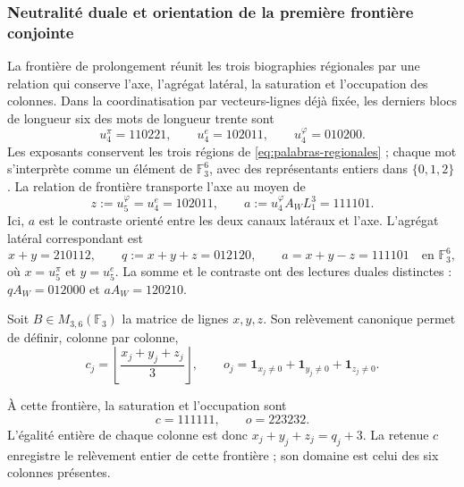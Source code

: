 \subsubsection{Neutralité duale et orientation de la première frontière conjointe}
\label{mg01:frontera}

La frontière de prolongement réunit les trois biographies régionales par
une relation qui conserve l'axe, l'agrégat latéral, la saturation et
l'occupation des colonnes. Dans la coordinatisation par vecteurs-lignes déjà fixée,
les derniers blocs de longueur six des mots de longueur trente
sont
\[
 u_4^\pi=110221,\qquad u_4^e=102011,\qquad
 u_4^\varphi=010200.
\]
Les exposants conservent les trois régions de
\eqref{eq:palabras-regionales} ; chaque mot s'interprète comme un
élément de \(\mathbb F_3^6\), avec des représentants entiers dans
\(\{0,1,2\}\). La relation de frontière transporte l'axe au moyen de
\begin{equation}
 z:=u_5^\varphi=u_4^e=102011,
 \qquad a:=u_4^\varphi A_WL_1^3=111101.
 \label{mg01:eje-contraste}
\end{equation}
Ici, \(a\) est le contraste orienté entre les deux canaux latéraux et
l'axe. L'agrégat latéral correspondant est
\begin{equation}
 x+y=210112,\qquad
 q:=x+y+z=012120,\qquad a=x+y-z=111101
 \quad\text{en }\mathbb F_3^6,
 \label{mg01:agregados}
\end{equation}
où \(x=u_5^\pi\) et \(y=u_5^e\). La somme et le contraste ont des
lectures duales distinctes : \(qA_W=012000\) et \(aA_W=120210\).

Soit \(B\in M_{3,6}(\mathbb F_3)\) la matrice de lignes \(x,y,z\).
Son relèvement canonique permet de définir, colonne par colonne,
\[
 c_j=\left\lfloor\frac{x_j+y_j+z_j}{3}\right\rfloor,
 \qquad
 o_j=\mathbf1_{x_j\ne0}+\mathbf1_{y_j\ne0}+\mathbf1_{z_j\ne0}.
\]


À cette frontière, la saturation et l'occupation sont
\begin{equation}
 c=111111,\qquad o=223232.
 \label{mg01:saturacion}
\end{equation}
L'égalité entière de chaque colonne est donc \(x_j+y_j+z_j=q_j+3\). La retenue \(c\) enregistre le relèvement entier de cette frontière ; son domaine est celui des six colonnes présentes.

